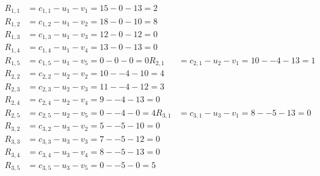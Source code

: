 \[
\begin{aligned}
R_{1,1} &= c_{1,1} - u_{1} - v_{1} = 15 - 0 - 13 = 2 \\
R_{1,2} &= c_{1,2} - u_{1} - v_{2} = 18 - 0 - 10 = 8 \\
R_{1,3} &= c_{1,3} - u_{1} - v_{3} = 12 - 0 - 12 = 0 \\
R_{1,4} &= c_{1,4} - u_{1} - v_{4} = 13 - 0 - 13 = 0 \\
R_{1,5} &= c_{1,5} - u_{1} - v_{5} = 0 - 0 - 0 = 0 
R_{2,1} &= c_{2,1} - u_{2} - v_{1} = 10 - -4 - 13 = 1 \\
R_{2,2} &= c_{2,2} - u_{2} - v_{2} = 10 - -4 - 10 = 4 \\
R_{2,3} &= c_{2,3} - u_{2} - v_{3} = 11 - -4 - 12 = 3 \\
R_{2,4} &= c_{2,4} - u_{2} - v_{4} = 9 - -4 - 13 = 0 \\
R_{2,5} &= c_{2,5} - u_{2} - v_{5} = 0 - -4 - 0 = 4 
R_{3,1} &= c_{3,1} - u_{3} - v_{1} = 8 - -5 - 13 = 0 \\
R_{3,2} &= c_{3,2} - u_{3} - v_{2} = 5 - -5 - 10 = 0 \\
R_{3,3} &= c_{3,3} - u_{3} - v_{3} = 7 - -5 - 12 = 0 \\
R_{3,4} &= c_{3,4} - u_{3} - v_{4} = 8 - -5 - 13 = 0 \\
R_{3,5} &= c_{3,5} - u_{3} - v_{5} = 0 - -5 - 0 = 5 
\end{aligned}
\]

